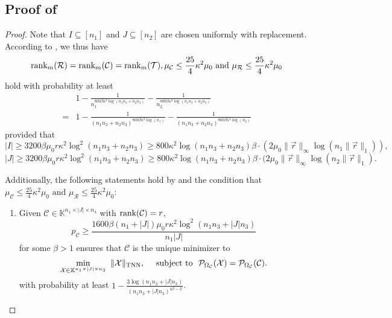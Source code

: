 \documentclass[twoside,12pt]{article}
\newcommand{\TNN}{\textnormal{TNN}}
\def\rank{\textnormal{rank}}
\def\rank{\textnormal{rank}}
\begin{document}
 \vspace{-20pt}
\subsection{Proof of }
\begin{proof}
Note that  $I\subseteq[n_1]$ and $J\subseteq[n_2]$ are chosen  uniformly   with replacement. According to , we thus have 
 \[\rank_m(\mathcal{R})=\rank_m(\mathcal{C})=\rank_m(\mathcal{T}), 
\mu_{\mathcal{C}}\leq \frac{25}{4}\kappa^2 \mu_0 \text{ and } 
 \mu_{\mathcal{R}}\leq \frac{25}{4}\kappa^2 \mu_0\]
 hold with probability at least 
\begin{align*}
   & 1-\frac{1}{n_1^{800\beta\kappa^2\log(n_1n_3+n_2n_3)}}-\frac{1}{n_2^{800\beta\kappa^2\log(n_1n_3+n_2n_3)}}\\
   =& 1-\frac{1}{(n_1n_3+n_2n_3)^{800\beta\kappa^2\log(n_1)}}-\frac{1}{(n_1n_3+n_2n_3)^{800\beta\kappa^2\log(n_2)}}
\end{align*} 
provided that  \[|I|\geq 3200\beta \mu_0 r\kappa^2\log^2(n_1n_3+n_2n_3)\geq 800\kappa^2\log(n_1n_3+n_2n_3)\beta \cdot(2  \mu_0 \|\vec{r}\|_{\infty} \log \left(n_1\|\vec{r}\|_{1}\right) ),\]
  \[
|J|\geq 3200\beta \mu_0 r\kappa^2\log^2(n_1n_3+n_2n_3)\geq 800\kappa^2\log(n_1n_3+n_2n_3)\beta\cdot(2 \mu_0 \|\vec{r}\|_{\infty} \log \left(n_2\|\vec{r}\|_{1}\right).
\]
 
Additionally, the following statements hold by    and   the condition that $\mu_{\mathcal{C}}\leq \frac{25}{4}\kappa^2 \mu_0 \text{ and } 
 \mu_{\mathcal{R}}\leq \frac{25}{4}\kappa^2 \mu_0$:
\begin{enumerate}[label=\roman*),leftmargin=.5in]
    \item Given $\mathcal{C}\in\mathbb{K}^{n_1\times|J|\times n_3}$ with $\rank(\mathcal{C})=r$, 
$$p_{\mathcal{C}} \geq \frac{1600\beta(n_1+|J|)\mu_0 r\kappa^2 \log^2(n_1n_3+|J|n_3)}{n_1|J|}$$ for some $\beta>1$ ensures that 
  $\mathcal{C}$ is the unique minimizer to 
\begin{align*}
\min_{\mathcal{X}\in\mathbb{K}^{n_1\times |J|\times n_3}}~\|\mathcal{X}\|_{\TNN},~~~ 
\text { subject to }~ \mathcal{P}_{\Omega_{\mathcal{C}}}(\mathcal{X})=\mathcal{P}_{\Omega_{\mathcal{C}}}(\mathcal{C}).
\end{align*}
with probability at least $1-  \frac{3\log(n_1n_3+|J|n_3)}{(n_1n_3+|J|n_3)^{4\beta-2}}$. 


\end{enumerate}
\end{proof}
\end{document}
